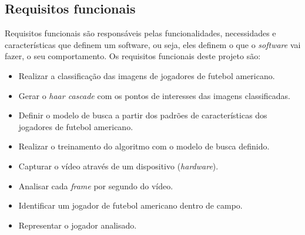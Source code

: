 \subsection{{Requisitos funcionais}}

Requisitos funcionais são responsáveis pelas funcionalidades, necessidades e características que definem um software, ou seja, eles definem o que o \textit{software} vai fazer, o seu comportamento. Os requisitos funcionais deste projeto são:

\begin{itemize}
\raggedright \item Realizar a classificação das imagens de jogadores de futebol americano.

\raggedright \item Gerar o \textit{haar cascade} com os pontos de interesses das imagens classificadas.

\raggedright \item Definir o modelo de busca a partir dos padrões de características dos jogadores de futebol americano.

\raggedright \item Realizar o treinamento do algoritmo com o modelo de busca definido.

\raggedright \item Capturar o vídeo através de um dispositivo (\textit{hardware}).

\raggedright \item Analisar cada \textit{frame} por segundo do vídeo.

\raggedright \item Identificar um jogador de futebol americano dentro de campo.

\raggedright \item Representar o jogador analisado.
\end{itemize}